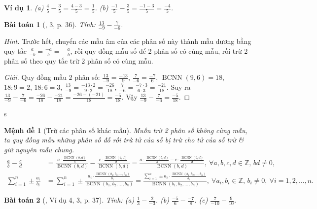 \documentclass{article}
\newtheorem{baitoan}{Bài toán}
\newtheorem{menhde}{Mệnh đề}
\newtheorem{vidu}{Ví dụ}
\begin{document}
\begin{vidu}
	(a) $\frac{4}{5} - \frac{3}{5} = \frac{4 - 3}{5} = \frac{1}{5}$. (b) $\frac{-1}{5} - \frac{3}{5} = \frac{-1 - 3}{5} = \frac{-4}{5}$.
\end{vidu}

\begin{baitoan}[\cite{SGK_Toan_6_Canh_Dieu_tap_2}, 3, p. 36]
	Tính: $\frac{13}{-9} - \frac{7}{-6}$.
\end{baitoan}
\noindent\textit{Hint.} Trước hết, chuyển các mẫu âm của các phân số này thành mẫu dương bằng quy tắc $\frac{a}{-b} = \frac{-a}{b} = -\frac{a}{b}$, rồi quy đồng mẫu số để 2 phân số có cùng mẫu, rồi trừ 2 phân số theo quy tắc trừ 2 phân số có cùng mẫu.

\begin{proof}[Giải]
	Quy đồng mẫu 2 phân số: $\frac{13}{-9} = \frac{-13}{9}$, $\frac{7}{-6} = \frac{-7}{6}$, $\operatorname{BCNN}(9,6) = 18$, $18:9 = 2$, $18:6 = 3$, $\frac{13}{-9} = \frac{-13\cdot2}{9\cdot2} = \frac{-26}{18}$, $\frac{7}{-6} = \frac{-7\cdot3}{6\cdot3} = \frac{-21}{18}$. Suy ra $\frac{13}{-9} - \frac{7}{-6} = \frac{-26}{18} - \frac{-21}{18} = \frac{-26 -(-21)}{18} = \frac{-5}{18}$. Vậy $\frac{13}{-9} - \frac{7}{-6} = \frac{-5}{18}$.
\end{proof}s

\begin{menhde}[Trừ các phân số khác mẫu]
	Muốn trừ 2 phân số không cùng mẫu, ta quy đồng mẫu những phân số đố rồi trừ tử của số bị trừ cho tử của số trừ \& giữ nguyên mẫu chung.
	\begin{align*}
		\frac{a}{b} - \frac{c}{d} &= \frac{a\cdot\frac{\operatorname{BCNN}(b,d)}{b}}{\operatorname{BCNN}(b,d)} - \frac{c\cdot\frac{\operatorname{BCNN}(b,d)}{d}}{\operatorname{BCNN}(b,d)} = \frac{a\cdot\frac{\operatorname{BCNN}(b,d)}{b} - c\cdot\frac{\operatorname{BCNN}(b,d)}{d}}{\operatorname{BCNN}(b,d)},\ \forall a,b,c,d\in\mathbb{Z},\,bd\ne0,\\
		\sum_{i=1}^n \pm\frac{a_i}{b_i} &= \sum_{i=1}^n \pm\frac{a_i\cdot\frac{\operatorname{BCNN}(b_1,b_2,\ldots,b_n)}{b_i}}{\operatorname{BCNN}(b_1,b_2,\ldots,b_n)} = \frac{\sum_{i=1}^n \pm a_i\cdot\frac{\operatorname{BCNN}(b_1,b_2,\ldots,b_n)}{b_i}}{\operatorname{BCNN}(b_1,b_2,\ldots,b_n)},\ \forall a_i,b_i\in\mathbb{Z},\,b_i\ne0,\ \forall i = 1,2,\ldots,n.
	\end{align*}
\end{menhde}

\begin{baitoan}[\cite{SGK_Toan_6_Canh_Dieu_tap_2}, Ví dụ 4, 3, p. 37]
	Tính: (a) $\frac{1}{3} - \frac{2}{-3}$. (b) $\frac{-5}{6} - \frac{-7}{8}$. (c) $\frac{7}{-10} - \frac{9}{10}$.
\end{baitoan}
\end{document}
